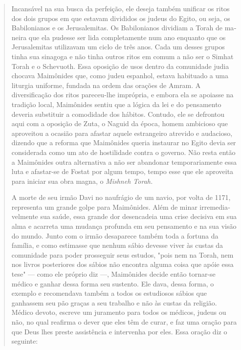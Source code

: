 \begin{quote}
Incansável na sua busca da perfeição, ele deseja também unificar os
ritos dos dois grupos em que estavam divididos os judeus do Egito, ou
seja, os Babilonianos e os Jerusalemitas. Os Babilonianos dividiam a
Torah de ma­neira que ela pudesse ser lida completamente num ano
enquanto que os Jerusa­lemitas utilizavam um ciclo de três anos. Cada um
desses grupos tinha sua sina­goga e não tinha outros ritos em comum a
não ser o Simhat Torah e o Sche­vuoth. Essa oposição de usos dentro da
comunidade judia chocava Maimôni­des que, como judeu espanhol, estava
habituado a uma liturgia uniforme, fun­dada na ordem das orações de
Amram. A diversificação dos ritos pareceu-lhe imprópria, e embora ela se
apoiasse na tradição local, Maimônides sentiu que a lógica da lei e do
pensamento deveria substituir a comodidade dos hábitos. Contudo, ele se
defrontou aqui com a oposição de Zuta, o Naguid da época, homem
ambicioso que aproveitou a ocasião para afastar aquele estrangeiro
atre­vido e audacioso, dizendo que a reforma que Maimônides queria
instaurar no Egito devia ser considerada como um ato de hostilidade
contra o governo. Não resta então a Maimônides outra alternativa a não
ser abandonar temporariamente essa luta e afastar-se de Fostat por algum
tempo, tempo esse que ele aproveita para iniciar sua obra magna, o
\emph{Mishneh Torah.}

A morte de seu irmão Davi no naufrágio de um navio, por volta de 1171,
representa um grande golpe para Maimônides. Além de minar
irremedia­velmente sua saúde, essa grande dor desencadeia uma crise
decisiva em sua al­ma e acarreta uma mudança profunda em seu pensamento
e na sua visão do
mundo. Junto com o irmão desaparece também toda a fortuna da família, e
co­mo estimasse que nenhum sábio devesse viver às custas da comunidade
para poder prosseguir seus estudos, "pois nem na Torah, nem nos livros
posterio­res dos sábios não encontra alguma coisa que apóie essa tese"
--- como ele pró­prio diz ---, Maimônides decide então tornar-se médico
e ganhar dessa forma seu sustento. Ele dava, dessa forma, o exemplo e
recomendava também a to­dos os estudiosos sábios que ganhassem seu pão
graças a seu trabalho e não às custas da religião. Médico devoto,
escreve um juramento para todos os mé­dicos, judeus ou não, no qual
reafirma o dever que eles têm de curar, e faz uma oração para que Deus
lhes preste assistência e intervenha por eles. Essa oração diz o
seguinte:


\end{quote}

